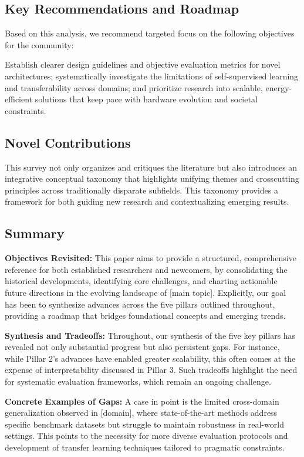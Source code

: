 \documentclass[sigconf]{acmart}
\begin{document}
\subsection{Key Recommendations and Roadmap}

Based on this analysis, we recommend targeted focus on the following objectives for the community:

Establish clearer design guidelines and objective evaluation metrics for novel architectures; systematically investigate the limitations of self-supervised learning and transferability across domains; and prioritize research into scalable, energy-efficient solutions that keep pace with hardware evolution and societal constraints.

\subsection{Novel Contributions}

This survey not only organizes and critiques the literature but also introduces an integrative conceptual taxonomy that highlights unifying themes and crosscutting principles across traditionally disparate subfields. This taxonomy provides a framework for both guiding new research and contextualizing emerging results.

\subsection{Summary}

\textbf{Objectives Revisited:} This paper aims to provide a structured, comprehensive reference for both established researchers and newcomers, by consolidating the historical developments, identifying core challenges, and charting actionable future directions in the evolving landscape of [main topic]. Explicitly, our goal has been to synthesize advances across the five pillars outlined throughout, providing a roadmap that bridges foundational concepts and emerging trends.

\textbf{Synthesis and Tradeoffs:} Throughout, our synthesis of the five key pillars has revealed not only substantial progress but also persistent gaps. For instance, while Pillar 2's advances have enabled greater scalability, this often comes at the expense of interpretability discussed in Pillar 3. Such tradeoffs highlight the need for systematic evaluation frameworks, which remain an ongoing challenge.

\textbf{Concrete Examples of Gaps:} A case in point is the limited cross-domain generalization observed in [domain], where state-of-the-art methods address specific benchmark datasets but struggle to maintain robustness in real-world settings. This points to the necessity for more diverse evaluation protocols and development of transfer learning techniques tailored to pragmatic constraints.
\end{document}
